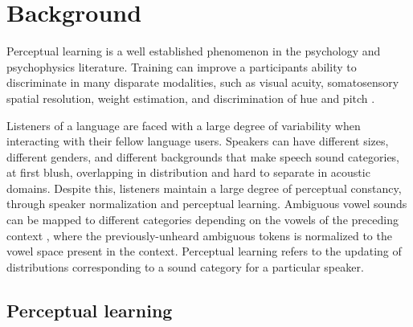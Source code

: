 
\chapter{Background}

Perceptual learning is a well established phenomenon in the psychology and psychophysics literature. Training can improve a participants ability to discriminate in many disparate modalities, such as visual acuity, somatosensory spatial resolution, weight estimation, and discrimination of hue and pitch \citep[reviewed in ]{Gibson1953}.  


Listeners of a language are faced with a large degree of variability when interacting with their fellow language users.  
Speakers can have different sizes, different genders, and different backgrounds that make speech sound categories, at first blush, overlapping in distribution and hard to separate in acoustic domains.
Despite this, listeners maintain a large degree of perceptual constancy, through speaker normalization and perceptual learning.  
Ambiguous vowel sounds can be mapped to different categories depending on the vowels of the preceding context \citep{Ladefoged1957}, where the previously-unheard ambiguous tokens is normalized to the vowel space present in the context.  
Perceptual learning refers to the updating of distributions corresponding to a sound category for a particular speaker.

\section{Perceptual learning}

